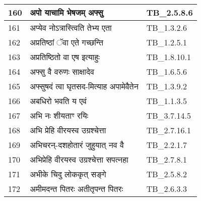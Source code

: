 \documentclass[17pt]{extarticle}
\begin{document}
\begin{longtable}{||p{0.4in}||p{4.9in}||p{0.9in}||}
    \hline
        
    160 & अपो याचामि भेषजम् अफ्सु & TB\_2.5.8.6       \\
    
    \hline
        
    161 & अप्येव नोऽत्रास्त्विति तेभ्य एता & TB\_1.3.2.6       \\
    
    \hline
        
    162 & अप्रतिष्ठां ॅवा एते गच्छन्ति & TB\_1.2.5.1       \\
    
    \hline
        
    163 & अप्रतिष्ठितो वा एष इत्याहुः & TB\_1.8.10.1       \\
    
    \hline
        
    164 & अफ्सु वै वरुणः साक्षादेव & TB\_1.6.5.6       \\
    
    \hline
        
    165 & अफ्सुषदं त्वा घृतसद{-}मित्याह अपामेवैतेन & TB\_1.3.9.2       \\
    
    \hline
        
    166 & अबधिरो भवति य एवं & TB\_1.1.3.5       \\
    
    \hline
        
    167 & अभि नः शीयताꣳ रयिः & TB\_3.7.14.5       \\
    
    \hline
        
    168 & अभि प्रेहि वीरयस्व उग्रश्चेत्ता & TB\_2.7.16.1       \\
    
    \hline
        
    169 & अभिचरन्{-}दशहोतारं जुहुयात् नव वै & TB\_2.2.1.7       \\
    
    \hline
        
    170 & अभिप्रेहि वीरयस्व उग्रश्चेत्ता सपत्नहा & TB\_2.7.8.1       \\
    
    \hline
        
    171 & अभीके चिदु लोककृत् सङ्गे & TB\_2.5.8.2       \\
    
    \hline
        
    172 & अमीमदन्त पितरः अतीतृपन्त पितरः & TB\_2.6.3.3       \\
    

\end{longtable}
\end{document}
